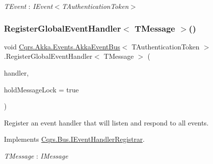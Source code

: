 \begin{Desc}
\item[Type Constraints]\begin{description}
\item[{\em T\+Event} : {\em I\+Event$<$T\+Authentication\+Token$>$}]\end{description}
\end{Desc}
\mbox{\label{classCqrs_1_1Akka_1_1Events_1_1AkkaEventBus_ab0df68070fbc625cad5cd2e74667b01d_ab0df68070fbc625cad5cd2e74667b01d}} 
\subsubsection{\texorpdfstring{Register\+Global\+Event\+Handler$<$ T\+Message $>$()}{RegisterGlobalEventHandler< TMessage >()}}
{\footnotesize\ttfamily void \hyperlink{classCqrs_1_1Akka_1_1Events_1_1AkkaEventBus}{Cqrs.\+Akka.\+Events.\+Akka\+Event\+Bus}$<$ T\+Authentication\+Token $>$.Register\+Global\+Event\+Handler$<$ T\+Message $>$ (\begin{DoxyParamCaption}\item[{Action$<$ T\+Message $>$}]{handler,  }\item[{bool}]{hold\+Message\+Lock = {\ttfamily true} }\end{DoxyParamCaption})}



Register an event handler that will listen and respond to all events. 



Implements \hyperlink{interfaceCqrs_1_1Bus_1_1IEventHandlerRegistrar_a80854abefd17bc58bd94e45266cf141e_a80854abefd17bc58bd94e45266cf141e}{Cqrs.\+Bus.\+I\+Event\+Handler\+Registrar}.

\begin{Desc}
\item[Type Constraints]\begin{description}
\item[{\em T\+Message} : {\em I\+Message}]\end{description}
\end{Desc}
\mbox{\label{classCqrs_1_1Akka_1_1Events_1_1AkkaEventBus_a59ec3e497e511b73b5239eee80691443_a59ec3e497e511b73b5239eee80691443}} 
